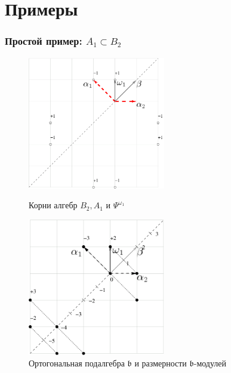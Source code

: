 \documentclass[pdftex]{beamer}
\theoremstyle{definition} \newtheorem{Def}{Определение}
\begin{document}
\section{Примеры}
\begin{frame}
  \frametitle{Простой пример: $A_{1}\subset B_{2}$}
  \begin{figure}[t]
    \vspace*{-0.5cm}
    \begin{multicols}{2}
      \hfill
      \includegraphics[width=60mm]{figures/figure1}
      \hfill
      \caption{Корни алгебр $B_{2},A_{1}$ и $\Psi ^{\omega_1  }$}
      \hfill
      \vspace{5mm}
      \includegraphics[width=60mm]{figures/figure2}
      \caption{Ортогональная подалгебра $\mathfrak{b}$ и размерности $\mathfrak{b}$-модулей}
    \end{multicols}
  \end{figure}
\end{frame}
\end{document}
